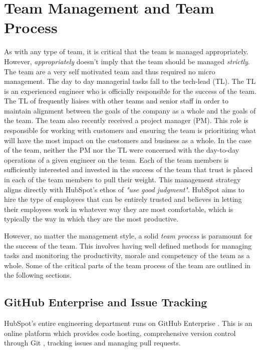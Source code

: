 \chapter{Team Management and Team Process}
As with any type of team, it is critical that the team is managed appropriately. However, \textit{appropriately} doesn't imply that the team should be managed \textit{strictly}. The \team{} team are a very self motivated team and thus required no micro management. The day to day managerial tasks fall to the tech-lead (TL). The TL is an experienced engineer who is officially responsible for the success of the team. The TL of \team{} frequently liaises with other teams and senior staff in order to maintain alignment between the goals of the company as a whole and the goals of the team. The \team{} team also recently received a project manager (PM). This role is responsible for working with customers and ensuring the team is prioritizing what will have the most impact on the customers and business as a whole. In the case of the \team{} team, neither the PM nor the TL were concerned with the day-to-day operations of a given engineer on the team. Each of the team members is sufficiently interested and invested in the success of the team that trust is placed in each of the team members to pull their weight. This management strategy aligns directly with HubSpot's ethos of \textit{"use good judgment"}. HubSpot aims to hire the type of employees that can be entirely trusted and believes in letting their employees work in whatever way they are most comfortable, which is typically the way in which they are the most productive.

However, no matter the management style, a solid \textit{team process} is paramount for the success of the team. This involves having well defined methods for managing tasks and monitoring the productivity, morale and competency of the team as a whole. Some of the critical parts of the team process of the \team{} team are outlined in the following sections.

\section{GitHub Enterprise and Issue Tracking}\label{sec:issueTracking}
HubSpot's entire engineering department runs on GitHub Enterprise \cite{githubEnterp}. This is an online platform which provides code hosting, comprehensive version control through Git \cite{git}, tracking issues and managing pull requests. 

